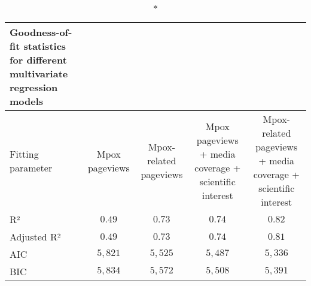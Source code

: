 \begin{longtable}{lcccc}
\caption*{
{\large Goodness-of-fit statistics for different multivariate regression models}
} \\ 
\toprule
Fitting parameter & Mpox pageviews & Mpox-related pageviews & Mpox pageviews + media coverage + scientific interest & Mpox-related pageviews + media coverage + scientific interest \\ 
\midrule\addlinespace[2.5pt]
R² & $0.49$ & $0.73$ & $0.74$ & $0.82$ \\ 
Adjusted R² & $0.49$ & $0.73$ & $0.74$ & $0.81$ \\ 
AIC & $5,821$ & $5,525$ & $5,487$ & $5,336$ \\ 
BIC & $5,834$ & $5,572$ & $5,508$ & $5,391$ \\ 
\bottomrule
\end{longtable}

